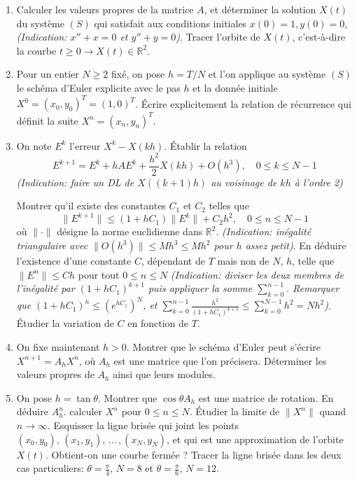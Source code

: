 \documentclass[a4paper]{article}
\begin{document}
\begin{enumerate}
\item Calculer les valeurs propres de la matrice $A$, et déterminer la solution $X(t)$ du système $(S)$ qui satisfait aux conditions initiales $x(0) = 1, y(0) = 0$, {\em (Indication: $x''+x=0$ et $y''+y=0$)}. Tracer l'orbite de $X(t)$, c'est-à-dire la courbe $t \geq 0 \to X(t) \in \mathbb{R}^2$.
\item Pour un entier $N \geq 2$ fixé, on pose $h = T/N$ et l'on applique au système $(S)$ le schéma d'Euler explicite avec le pas $h$ et la donnée initiale $X^0 = (x_0,y_0)^T = (1,0)^T$. Écrire explicitement la relation de récurrence qui définit la suite $X^n = (x_n,y_n)^T$.
\item On note $E^k$ l'erreur $X^k - X(kh)$. Établir la relation 
\[ E^{k+1} = E^k+h A E^k + \frac{h^2}{2}X(kh)+O(h^3), \quad  0\leq k\leq N-1\]
{\em (Indication: faire un DL de $X((k+1)h)$ au voisinage de $kh$ à l'ordre 2)}

 Montrer qu'il existe des constantes $C_1$ et $C_2$ telles que
\[ \|E^{k+1}\| \leq (1+h C_1)\|E^k\| + C_2 h^2,\quad 0\leq n\leq N-1\]
où  $\|\cdot\|$ désigne la norme euclidienne dans $\mathbb{R}^2$. {\em (Indication: inégalité triangulaire avec $\|O(h^3)\|\leq M h^3\leq M h^2$ pour $h$ assez petit)}. En déduire l'existence d'une constante $C$, dépendant de $T$ mais non de $N$, $h$, telle que $\|E^n\| \leq  C h$ pour tout $0 \leq n \leq N$ {\em (Indication: diviser les deux membres de l'inégalité par $(1+h C_1)^{k+1}$ puis appliquer la somme $\sum_{k=0}^{n-1}$. Remarquer que $(1+hC_1)^n\leq (e^{hC_1})^N$, et $\sum_{k=0}^{n-1}\frac{h^2}{(1+h C_1)^{k+1}}\leq \sum_{k=0}^{N-1}h^2 =Nh^2$)}. Étudier la variation de $C$ en fonction de $T$.
\item On fixe maintenant $h > 0$. Montrer que le schéma d'Euler peut s'écrire $X^{n+1} = A_h X^n$, où $A_h$ est une matrice que l'on précisera.  Déterminer les valeurs propres de $A_h$ ainsi que leurs modules.
\item On pose $h=\tan\theta$. Montrer que $\cos\theta A_h$ est une matrice de rotation. En déduire $A_h^n$. calculer $X^n$ pour $0 \leq n \leq N$. Étudier la limite de $\|X^n\| $ quand $n\to\infty$. Esquisser la ligne brisée qui joint les points $(x_0, y_0),\, (x_1, y_1),\, . . .\, , (x_N , y_N )$, et qui est une approximation de l'orbite $X(t)$. Obtient-on une courbe fermée ? Tracer la ligne brisée dans les deux cas particuliers: $\theta=\frac{\pi}{4}$, $N=8$ et $\theta=\frac{\pi}{6}$, $N=12$.
\end{enumerate}
\end{document}

